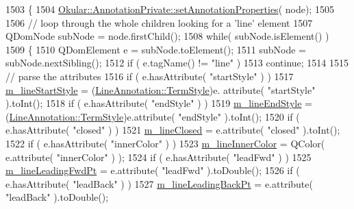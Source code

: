 \begin{DoxyCode}
1503 \{
1504     \hyperlink{classOkular_1_1AnnotationPrivate_a5fc7b450fa8c7e2717372e7394c3aa39}{Okular::AnnotationPrivate::setAnnotationProperties}(
      node);
1505 
1506     \textcolor{comment}{// loop through the whole children looking for a 'line' element}
1507     QDomNode subNode = node.firstChild();
1508     \textcolor{keywordflow}{while}( subNode.isElement() )
1509     \{
1510         QDomElement e = subNode.toElement();
1511         subNode = subNode.nextSibling();
1512         \textcolor{keywordflow}{if} ( e.tagName() != \textcolor{stringliteral}{"line"} )
1513             \textcolor{keywordflow}{continue};
1514 
1515         \textcolor{comment}{// parse the attributes}
1516         \textcolor{keywordflow}{if} ( e.hasAttribute( \textcolor{stringliteral}{"startStyle"} ) )
1517             \hyperlink{classOkular_1_1LineAnnotationPrivate_aabf0926a14575248365c4e5de9d11296}{m\_lineStartStyle} = (\hyperlink{classOkular_1_1LineAnnotation_a67e1128311347eabfd909909facabec6}{LineAnnotation::TermStyle})e.
      attribute( \textcolor{stringliteral}{"startStyle"} ).toInt();
1518         \textcolor{keywordflow}{if} ( e.hasAttribute( \textcolor{stringliteral}{"endStyle"} ) )
1519             \hyperlink{classOkular_1_1LineAnnotationPrivate_a863fad380ea94af5d61687b7afb9ef4c}{m\_lineEndStyle} = (\hyperlink{classOkular_1_1LineAnnotation_a67e1128311347eabfd909909facabec6}{LineAnnotation::TermStyle})e.attribute(
       \textcolor{stringliteral}{"endStyle"} ).toInt();
1520         \textcolor{keywordflow}{if} ( e.hasAttribute( \textcolor{stringliteral}{"closed"} ) )
1521             \hyperlink{classOkular_1_1LineAnnotationPrivate_a907d7a68ff88495dd5d318de5fdf53f3}{m\_lineClosed} = e.attribute( \textcolor{stringliteral}{"closed"} ).toInt();
1522         \textcolor{keywordflow}{if} ( e.hasAttribute( \textcolor{stringliteral}{"innerColor"} ) )
1523             \hyperlink{classOkular_1_1LineAnnotationPrivate_a8000d981312a77260058c7bab0523dd0}{m\_lineInnerColor} = QColor( e.attribute( \textcolor{stringliteral}{"innerColor"} ) );
1524         \textcolor{keywordflow}{if} ( e.hasAttribute( \textcolor{stringliteral}{"leadFwd"} ) )
1525             \hyperlink{classOkular_1_1LineAnnotationPrivate_affc0c88c47cf398b4cb52e94cae615ff}{m\_lineLeadingFwdPt} = e.attribute( \textcolor{stringliteral}{"leadFwd"} ).toDouble();
1526         \textcolor{keywordflow}{if} ( e.hasAttribute( \textcolor{stringliteral}{"leadBack"} ) )
1527             \hyperlink{classOkular_1_1LineAnnotationPrivate_a98ba85c09e6201d9df8da64c918c6a49}{m\_lineLeadingBackPt} = e.attribute( \textcolor{stringliteral}{"leadBack"} ).toDouble();

\end{DoxyCode}
